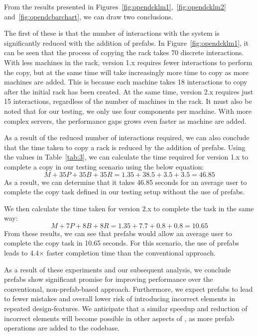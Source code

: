 \documentclass[11pt]{article}
\begin{document}
			From the results presented in Figures~\ref{fig:opendcklm1},~\ref{fig:opendcklm2} and~\ref{fig:opendcbarchart}, we can draw two conclusions.

			The first of these is that the number of interactions with the system is significantly reduced with the addition of prefabs.
			In Figure~\ref{fig:opendcklm1}, it can be seen that the process of copying the rack takes 70 discrete interactions.
			With less machines in the rack, version 1.x requires fewer interactions to perform the copy, but at the same time will take increasingly more time to copy as more machines are added.
			This is because each machine takes 18 interactions to copy after the initial rack has been created.
			At the same time, version 2.x requires just 15 interactions, regardless of the number of machines in the rack.
			It must also be noted that for our testing, we only use four components per machine.
			With more complex servers, the performance gaps grows even faster as machine are added.

			As a result of the reduced number of interactions required, we can also conclude that the time taken to copy a rack is reduced by the addition of prefabs.
			Using the values in Table~\ref{tab:3}, we can calculate the time required for version 1.x to complete a copy in our testing scenario using the below equation:
			$$M + 35P + 35B + 35R= 1.35 + 38.5 + 3.5 + 3.5= 46.85$$
			As a result, we can determine that it takes 46.85 seconds for an average user to complete the copy task defined in our testing setup without the use of prefabs.

			We then calculate the time taken for version 2.x to complete the task in the same way:
			$$M + 7P + 8B + 8R= 1.35 + 7.7 + 0.8 + 0.8= 10.65$$
			From these results, we can see that prefabs would allow an average user to complete the copy task in 10.65 seconds.
			For this scenario, the use of prefabs leads to 4.4$\times$ faster completion time than the conventional approach.

			As a result of these experiments and our subsequent analysis, we conclude prefabs show significant promise for improving performance over the conventional, non-prefab-based approach. 
			Furthermore, we expect prefabs to lead to fewer mistakes and overall lower risk of introducing incorrect elements in repeated design-features. 
			We anticipate that a similar speedup and reduction of incorrect elements will become possible in other aspects of \opendc{}, as more prefab operations are added to the \opendc{} codebase.
\end{document}
